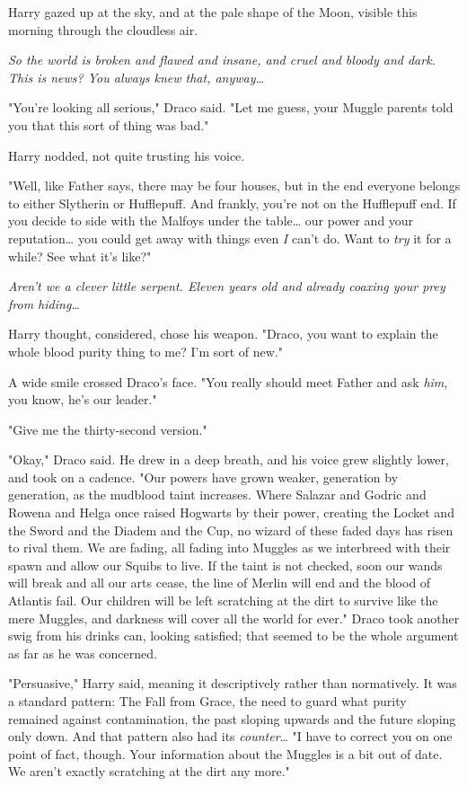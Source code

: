 Harry gazed up at the sky, and at the pale shape of the Moon, visible this
morning through the cloudless air.

\emph{So the world is broken and flawed and insane, and cruel and bloody and
dark. This is news? You always knew that, anyway{\ldots}}

"You're looking all serious," Draco said. "Let me guess, your Muggle parents
told you that this sort of thing was bad."

Harry nodded, not quite trusting his voice.

"Well, like Father says, there may be four houses, but in the end everyone
belongs to either Slytherin or Hufflepuff. And frankly, you're not on the
Hufflepuff end. If you decide to side with the Malfoys under the table{\ldots}
our power and your reputation{\ldots} you could get away with things even
\emph{I} can't do. Want to \emph{try} it for a while? See what it's like?"

\emph{Aren't we a clever little serpent. Eleven years old and already coaxing
your prey from hiding{\ldots}}

Harry thought, considered, chose his weapon. "Draco, you want to explain the
whole blood purity thing to me? I'm sort of new."

A wide smile crossed Draco's face. "You really should meet Father and ask
\emph{him}, you know, he's our leader."

"Give me the thirty-second version."

"Okay," Draco said. He drew in a deep breath, and his voice grew slightly
lower, and took on a cadence. "Our powers have grown weaker, generation by
generation, as the mudblood taint increases. Where Salazar and Godric and
Rowena and Helga once raised Hogwarts by their power, creating the Locket and
the Sword and the Diadem and the Cup, no wizard of these faded days has risen
to rival them. We are fading, all fading into Muggles as we interbreed with
their spawn and allow our Squibs to live. If the taint is not checked, soon our
wands will break and all our arts cease, the line of Merlin will end and the
blood of Atlantis fail. Our children will be left scratching at the dirt to
survive like the mere Muggles, and darkness will cover all the world for ever."
Draco took another swig from his drinks can, looking satisfied; that seemed to
be the whole argument as far as he was concerned.

"Persuasive," Harry said, meaning it descriptively rather than normatively. It
was a standard pattern: The Fall from Grace, the need to guard what purity
remained against contamination, the past sloping upwards and the future sloping
only down. And that pattern also had its \emph{counter}{\ldots} "I have to
correct you on one point of fact, though. Your information about the Muggles is
a bit out of date. We aren't exactly scratching at the dirt any more."

